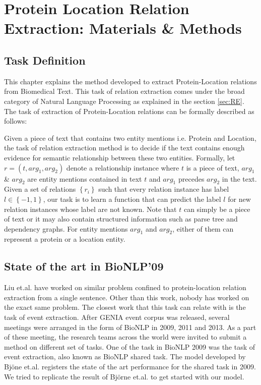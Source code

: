 \chapter{Protein Location Relation Extraction: Materials \& Methods}\label{chapter:methods}
\newcommand*{\xml}[1]{\texttt{<#1>}}
\section{Task Definition}

This chapter explains the method developed to extract Protein-Location relations from Biomedical Text. This task of relation extraction comes under the broad category of Natural Language Processing as explained in the section \ref{sec:RE}. The task of extraction of Protein-Location relations can be formally described as follows:

Given a piece of text that contains two entity mentions i.e. Protein and Location, the task of relation extraction method is to decide if the text contains enough evidence for semantic relationship between these two entities. Formally, let $r=(t,arg_1,arg_2)$ denote a relationship instance where $t$ is a piece of text, $arg_1$ \& $arg_2$  are entity mentions contained in text $t$ and $arg_1$ precedes $arg_2$ in the text. Given a set of relations $\left\lbrace r_i \right\rbrace$ such that every relation instance has label $l \in \left\lbrace-1,1\right\rbrace$, our task is to learn a function that can predict the label $l$ for new relation instances whose label are not known. Note that $t$ can simply be a piece of text or it may also contain structured information such as parse tree and dependency graphs. For entity mentions $arg_1$ and $arg_2$, either of them can represent a protein or a location entity.
 

\section{State of the art in BioNLP'09}

Liu et.al. have worked on similar problem confined to protein-location relation extraction from a single sentence. Other than this work, nobody has worked on the exact same problem. The closest work that this task can relate with is the task of event extraction. After GENIA event corpus was released, several meetings were arranged in the form of BioNLP in 2009, 2011 and 2013. As a part of these meeting, the research teams across the world were invited to submit a method on different set of tasks. One of the task in BioNLP 2009 was the task of event extraction, also known as BioNLP shared task. The model developed by Bj{\"o}ne et.al. registers the state of the art performance for the shared task in 2009. We tried to replicate the result of Björne et.al. to get started with our model.

